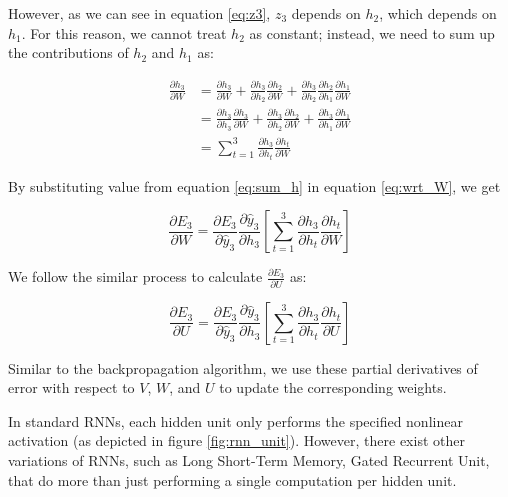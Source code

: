 However, as we can see in equation \ref{eq:z3}, $z_3$ depends on $h_2$, which depends on $h_1$. For this reason, we cannot treat $h_2$ as constant; instead, we need to sum up the contributions of $h_2$ and $h_1$ as:

\begin{align}
    \frac{\partial h_3}{\partial W} &= \frac{\partial h_3}{\partial W} + \frac{\partial h_3}{\partial h_2} \frac{\partial h_2}{\partial W} + \frac{\partial h_3}{\partial h_2}\frac{\partial h_2}{\partial h_1}\frac{\partial h_1}{\partial W} \nonumber \\
                                    &= \frac{\partial h_3}{\partial h_3} \frac{\partial h_3}{\partial W} + \frac{\partial h_3}{\partial h_2} \frac{\partial h_2}{\partial W} + \frac{\partial h_3}{\partial h_1} \frac{\partial h_1}{\partial W} \nonumber \\
                                    &= \sum_{t=1}^{3} \frac{\partial h_3}{\partial h_t} \frac{\partial h_t}{\partial W} \label{eq:sum_h}
\end{align}

By substituting value from equation \ref{eq:sum_h} in equation \ref{eq:wrt_W}, we get

\begin{equation}
    \frac{\partial E_3}{\partial W} = \frac{\partial E_3}{\partial \hat{y}_3} \frac{\partial \hat{y}_3}{\partial h_3} \left[ \sum_{t=1}^{3} \frac{\partial h_3}{\partial h_t} \frac{\partial h_t}{\partial W} \right]
\end{equation}

We follow the similar process to calculate $\frac{\partial E_3}{\partial U}$ as:

\begin{equation}
    \frac{\partial E_3}{\partial U} = \frac{\partial E_3}{\partial \hat{y}_3} \frac{\partial \hat{y}_3}{\partial h_3} \left[ \sum_{t=1}^{3} \frac{\partial h_3}{\partial h_t} \frac{\partial h_t}{\partial U} \right]
\end{equation}

Similar to the backpropagation algorithm, we use these partial derivatives of error with respect to $V$, $W$, and $U$ to update the corresponding weights.

In standard RNNs, each hidden unit only performs the specified nonlinear activation (as depicted in figure \ref{fig:rnn_unit}). However, there exist other variations of RNNs, such as Long Short-Term Memory, Gated Recurrent Unit, that do more than just performing a single computation per hidden unit.

